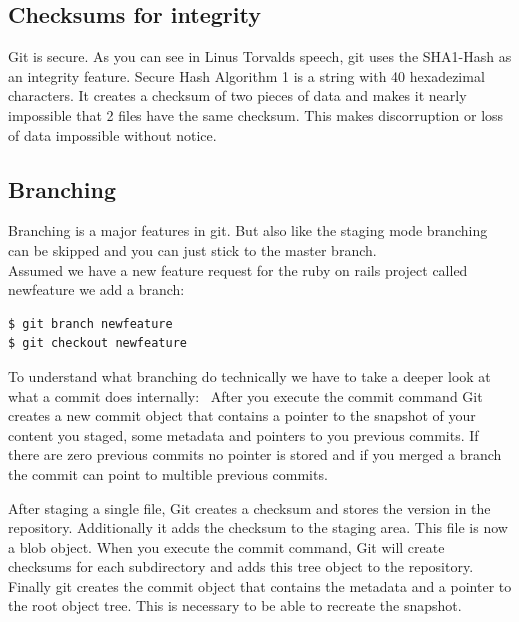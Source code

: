 \subsection{Checksums for integrity}

 \cite{googletechtalk2007}

Git is secure. As you can see in Linus Torvalds speech, git uses the SHA1-Hash
as an integrity feature. Secure Hash Algorithm 1 is a string with 40 hexadezimal
characters. It creates a checksum of two pieces of data and makes it nearly
impossible that 2 files have the same checksum. This makes discorruption or loss
of data impossible without notice. \cite[Chapter 1.3]{gitpro2009}

\subsection {Branching}

Branching is a major features in git. But also like the staging mode
branching can be skipped and you can just stick to the master
branch. \\
Assumed we have a new feature request for the ruby on rails project called
newfeature we add a branch:
\begin{lstlisting}
$ git branch newfeature
$ git checkout newfeature
\end{lstlisting}

To understand what branching do technically we have to take a deeper look at
what a commit does internally: \
After you execute the commit command Git creates a new commit object that
contains a pointer to the snapshot of your content you staged, some metadata and
pointers to you previous commits. If there are zero previous commits no pointer
is stored and if you merged a branch the commit can point to multible previous commits.

After staging a single file, Git creates a checksum and stores the version in the repository. Additionally it adds the
checksum to the staging area. This file is now a blob object.
When you execute the commit command, Git will create checksums for each
subdirectory and adds this tree object to the repository. Finally git creates
the commit object that contains the metadata and a pointer to the root object
tree. This is necessary to be able to recreate the snapshot.

